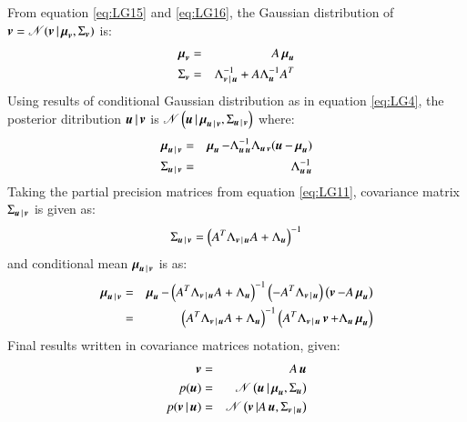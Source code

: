 From equation \ref{eq:LG15} and \ref{eq:LG16}, the Gaussian distribution of $ \operatorname{\boldsymbol{v}} = \mathscr{N}(\operatorname{\boldsymbol{v}}| \operatorname{\boldsymbol{\mu}}_{\operatorname{\boldsymbol{v}}},\Sigma_{\operatorname{\boldsymbol{v}}}) $ is:
\begin{eqnarray}
	\mybold{\mu}_{\mybold{v}} =&& A\mybold{\mu}_{\mybold{u}} \nonumber\\
	\Sigma_{\mybold{v}} =&& \Lambda^{-1}_{\mybold{v}|\mybold{u}} + A\Lambda^{-1}_{\mybold{u}}A^T
\label{eq:LG17}
\end{eqnarray}
Using results of conditional Gaussian distribution as in equation \ref{eq:LG4}, the posterior ditribution $ \operatorname{\boldsymbol{u}}|\operatorname{\boldsymbol{v}} $ is $ \mathscr{N} \left(\operatorname{\boldsymbol{u}}|\operatorname{\boldsymbol{\mu}}_{\operatorname{\boldsymbol{u}}|\operatorname{\boldsymbol{v}}}, \Sigma_{\operatorname{\boldsymbol{u}}|\operatorname{\boldsymbol{v}}} \right) $ where:
\begin{eqnarray}
	\mybold{\mu}_{\mybold{u}|\mybold{v}} =&& \mybold{\mu}_{\mybold{u}}-\Lambda^{-1}_{\mybold{u}\mybold{u}} \Lambda_{\mybold{u}\mybold{v}} (\mybold{u}-\mybold{\mu}_{\mybold{u}}) \nonumber\\
	\Sigma_{\mybold{u}|\mybold{v}} =&& \Lambda^{-1}_{\mybold{u}\mybold{u}}
\label{eq:LG18}
\end{eqnarray}
Taking the partial precision matrices from equation \ref{eq:LG11}, covariance matrix $ \Sigma_{\operatorname{\boldsymbol{u}}|\operatorname{\boldsymbol{v}}} $ is given as:
\begin{equation}
	\Sigma_{\mybold{u}|\mybold{v}}= \left(A^T\Lambda_{\mybold{v}|\mybold{u}}A+\Lambda_{\mybold{u}}\right)^{-1} 
\label{eq:LG19}	
\end{equation}
and conditional mean $ \operatorname{\boldsymbol{\mu}}_{\operatorname{\boldsymbol{u}}|\operatorname{\boldsymbol{v}}} $ is as:
\begin{eqnarray}
	\mybold{\mu}_{\mybold{u}|\mybold{v}} =&& \mybold{\mu}_{\mybold{u}}- \left(	A^T\Lambda_{\mybold{v}|\mybold{u}}A+\Lambda_{\mybold{u}} \right) ^{-1} \left( -A^T\Lambda_{\mybold{v}|\mybold{u}} \right) \left( \mybold{v}- A\mybold{\mu}_{\mybold{u}} \right) \nonumber\\
	=&& \left(	A^T\Lambda_{\mybold{v}|\mybold{u}}A+\Lambda_{\mybold{u}} \right)^{-1} \left(	A^T\Lambda_{\mybold{v}|\mybold{u}} \mybold{v} +\Lambda_{\mybold{u}}\mybold{\mu}_{\mybold{u}} \right)
\label{eq:LG20}
\end{eqnarray}
Final results written in covariance matrices notation, given:
\begin{eqnarray}
	\mybold{v} =&& A\mybold{u} \nonumber\\
	p(\mybold{u}) =&& \distr \left( \mybold{u}| \mybold{\mu}_{\mybold{u}},\Sigma_{\mybold{u}} \right) \nonumber\\
	p(\mybold{v}|\mybold{u}) =&& \distr \left( \mybold{v}| A\mybold{u},\Sigma_{\mybold{v}|\mybold{u}} \right)
\label{eq:LG21}	
\end{eqnarray}
